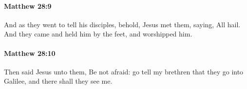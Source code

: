 		\paragraph{Matthew 28:9} %
			\label{MATTHEW-28-9}

			And as they went to tell his disciples, behold, Jesus met them, saying, All hail. And they came and held him by the feet, and worshipped him.

			\begin{framed}
			\scriptsize
				\begin{compactdesc}
					\item[SBLG] 
				\end{compactdesc}
			\end{framed}

		\paragraph{Matthew 28:10} %
			\label{MATTHEW-28-10}

			Then said Jesus unto them, Be not afraid: go tell my brethren that they go into Galilee, and there shall they see me.

